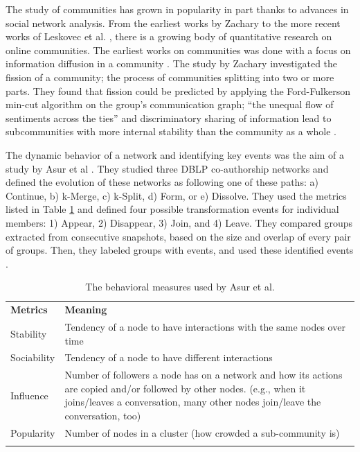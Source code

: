 \documentclass[12pt,letterpaper]{gthesis2}  %
\begin{document}
The study of communities has grown in popularity in part thanks to advances in social network analysis.  From the earliest works by Zachary \cite{Zachary} to the more recent works of Leskovec et al. \cite{LeskovecGraphsOverTime}\cite{LeskovecStatisticalPropertiesOfCommunityStructure}, there is a growing body of quantitative research on online communities. The earliest works on communities was done with a focus on information diffusion in a community \cite{Zachary}. The study by Zachary investigated the fission of a community; the process of communities splitting into two or more parts. They found that fission could be predicted by applying the Ford-Fulkerson min-cut algorithm \cite{Ford} on the group's communication graph; ``the unequal flow of sentiments across the ties'' and discriminatory sharing of information lead to subcommunities with more internal stability than the community as a whole \cite{Zachary}.

The dynamic behavior of a network and identifying key events was the aim of a study by Asur et al \cite{Asur}. They studied three DBLP co-authorship networks and defined the evolution of these networks as following one of these paths: a) Continue, b) k-Merge, c) k-Split, d) Form, or e) Dissolve. They used the metrics listed in Table \ref{tableDiversityMeasuresAsurEtAl} and defined four possible transformation events for individual members: 1) Appear, 2) Disappear, 3) Join, and 4) Leave. They compared groups extracted from consecutive snapshots, based on the size and overlap of every pair of groups. Then, they labeled groups with events, and used these identified events \cite{Asur}.

\begin{table}[!htbp]
\caption{The behavioral measures used by Asur et al. \cite{Asur}}
\label{tableDiversityMeasuresAsurEtAl} 
\begin{tabular}{p{} p{}}
\hline\noalign{\smallskip}
\textbf{Metrics} & \textbf{Meaning} \\
\noalign{\smallskip}\hline\noalign{\smallskip}
Stability & Tendency of a node to have interactions with the same nodes over time \\ \hline
Sociability & Tendency of a node to have different interactions \\\hline
Influence & Number of followers a node has on a network and how its actions are copied and/or followed by other nodes. (e.g., when it joins/leaves a conversation, many other nodes join/leave the conversation, too) \\\hline
Popularity & Number of nodes in a cluster (how crowded a sub-community is) \\
\noalign{\smallskip}\hline
\end{tabular}
\end{table}
\end{document}
